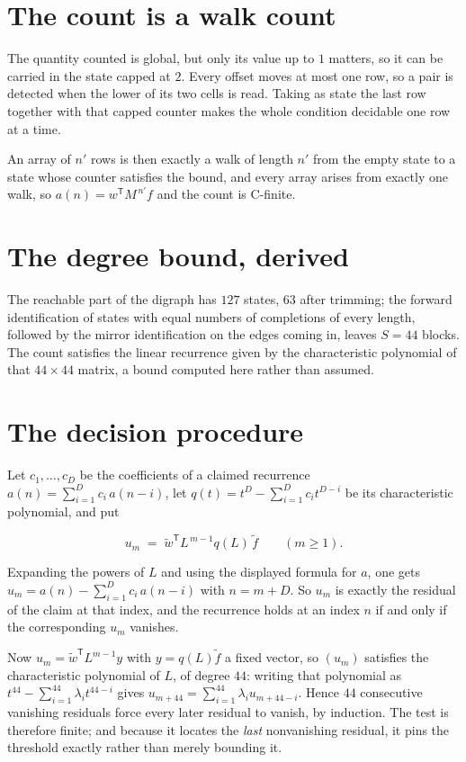 \documentclass[11pt]{article}
\theoremstyle{definition}
\begin{document}
\section{The count is a walk count}

The quantity counted is global, but only its value up to $1$ matters, so it can be carried in the state capped at $2$. Every offset moves at most one row, so a pair is detected when the lower of its two cells is read. Taking as state the last row together with that capped counter makes the whole condition decidable one row at a time.

An array of $n'$ rows is then exactly a walk of length $n'$ from the empty state to a state whose counter satisfies the bound, and every array arises from exactly one walk, so $a(n) = w^{\mathsf T}M^{\,n'}f$ and the count is C-finite.

\section{The degree bound, derived}

The reachable part of the digraph has $127$ states, $63$ after trimming; the forward identification of states with equal numbers of completions of every length, followed by the mirror identification on the edges coming in, leaves $S = 44$ blocks. The count satisfies the linear recurrence given by the characteristic polynomial of that $44\times44$ matrix, a bound computed here rather than assumed.

\section{The decision procedure}

Let $c_1,\dots,c_D$ be the coefficients of a claimed recurrence $a(n) = \sum_{i=1}^{D} c_i\,a(n-i)$, let $q(t) = t^{D} - \sum_{i=1}^{D} c_i t^{D-i}$ be its characteristic polynomial, and put

\[u_m \;=\; \tilde w^{\mathsf T} L^{\,m-1} q(L)\,\tilde f \qquad (m \ge 1).\]

Expanding the powers of $L$ and using the displayed formula for $a$, one gets $u_m = a(n) - \sum_{i=1}^{D} c_i\,a(n-i)$ with $n = m + D$. So $u_m$ is exactly the residual of the claim at that index, and the recurrence holds at an index $n$ if and only if the corresponding $u_m$ vanishes.

Now $u_m = \tilde w^{\mathsf T} L^{m-1} y$ with $y = q(L)\tilde f$ a fixed vector, so $(u_m)$ satisfies the characteristic polynomial of $L$, of degree $44$: writing that polynomial as $t^{44} - \sum_{i=1}^{44} \lambda_i t^{44-i}$ gives $u_{m+44} = \sum_{i=1}^{44} \lambda_i u_{m+44-i}$. Hence $44$ consecutive vanishing residuals force every later residual to vanish, by induction. The test is therefore finite; and because it locates the {\itshape last} nonvanishing residual, it pins the threshold exactly rather than merely bounding it.
\end{document}
